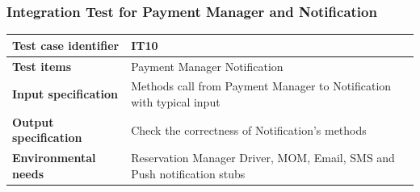 \documentclass{article}
\begin{document}
			\subsubsection{Integration Test for Payment Manager and Notification} \label{sec:3.1.8}
				\begin{minipage}{\linewidth}
				\end{minipage}
				\begin{center}
					\setlength{\tabcolsep}{24pt}
					\renewcommand{\arraystretch}{1.4}
					\begin{tabular}{ | l | p{8cm} |}\hline
						\textbf{Test case identifier} & IT10\\\hline
						\textbf{Test items} & Payment Manager \textrightarrow Notification\\\hline
						\textbf{Input specification} & Methods call from Payment Manager to Notification with typical input \\\hline
						\textbf{Output specification} & Check the correctness of Notification's methods \\\hline
						\textbf{Environmental needs} & Reservation Manager Driver, MOM, Email, SMS and Push notification stubs \\\hline
					\end{tabular}
				\end{center}
				\pagebreak
\end{document}
